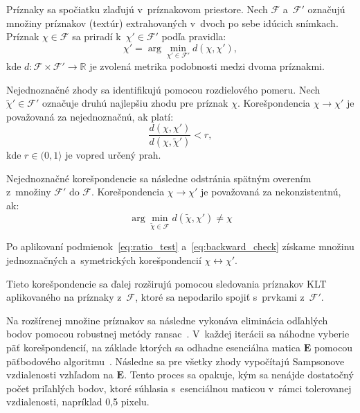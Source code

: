       Príznaky sa spočiatku zlaďujú v~príznakovom priestore. Nech $\mathcal{F}$ a~$\mathcal{F}'$ označujú množiny príznakov (textúr) extrahovaných v~dvoch po sebe idúcich snímkach. Príznak $\chi \in \mathcal{F}$ sa priradí k~$\chi' \in \mathcal{F}'$ podľa pravidla:
      \begin{equation}
      \chi' = \arg\min_{\chi' \in \mathcal{F}'} d(\chi, \chi'),
      \label{eq:match_min}
      \end{equation}
      kde $d : \mathcal{F} \times \mathcal{F}' \rightarrow \mathbb{R}$ je zvolená metrika podobnosti medzi dvoma príznakmi.

      Nejednoznačné zhody sa identifikujú pomocou rozdielového pomeru. Nech $\tilde{\chi}' \in \mathcal{F}'$ označuje druhú najlepšiu zhodu pre príznak $\chi$. Korešpondencia $\chi \rightarrow \chi'$ je považovaná za nejednoznačnú, ak platí:
      \begin{equation}
      \frac{d(\chi, \chi')}{d(\chi, \tilde{\chi}')} < r,
      \label{eq:ratio_test}
      \end{equation}
      kde $r \in (0, 1\rangle$ je vopred určený prah.

      Nejednoznačné korešpondencie sa následne odstránia spätným overením z~množiny $\mathcal{F}'$ do $\mathcal{F}$. Korešpondencia $\chi \rightarrow \chi'$ je považovaná za nekonzistentnú, ak:
      \begin{equation}
      \arg\min_{\tilde{\chi} \in \mathcal{F}} d(\tilde{\chi}, \chi') \ne \chi
      \label{eq:backward_check}
      \end{equation}

      Po aplikovaní podmienok~\eqref{eq:ratio_test} a~\eqref{eq:backward_check} získame množinu jednoznačných a~symetrických korešpondencií $\chi \leftrightarrow \chi'$.

      Tieto korešpondencie sa ďalej rozširujú pomocou sledovania príznakov KLT~\cite{tomasiDetectionTrackingPoint1991a} aplikovaného na príznaky z~$\mathcal{F}$, ktoré sa nepodarilo spojiť s~prvkami z~$\mathcal{F}'$.

      Na rozšírenej množine príznakov sa následne vykonáva eliminácia odľahlých bodov pomocou robustnej metódy \acrshort{ransac}~\cite{fischlerRandomSampleConsensus1981}. V~každej iterácii sa náhodne vyberie päť korešpondencií, na základe ktorých sa odhadne esenciálna matica $\mathbf{E}$ pomocou päťbodového algoritmu~\cite{nisterEfficientSolutionFivepoint2004}. Následne sa pre všetky zhody vypočítajú Sampsonove vzdialenosti vzhľadom na $\mathbf{E}$. Tento proces sa opakuje, kým sa nenájde dostatočný počet priľahlých bodov, ktoré súhlasia s~esenciálnou maticou v~rámci tolerovanej vzdialenosti, napríklad 0,5 pixelu.

